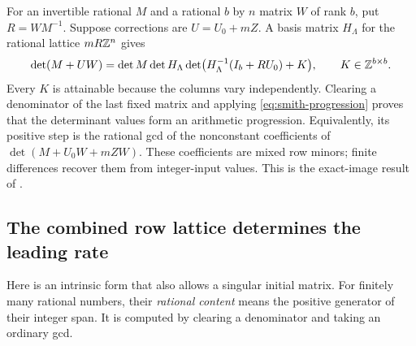 For an invertible rational $M$ and a rational $b$ by $n$ matrix $W$
of rank $b$, put $R=WM^{-1}$. Suppose corrections are
$U=U_0+mZ$. A basis matrix $H_\Lambda$ for the rational lattice
$mR\mathbb Z^n$ gives
\[
 \det(M+UW)=\det M\det H_\Lambda
       \det\bigl(H_\Lambda^{-1}(I_b+RU_0)+K\bigr),
 \qquad K\in\mathbb Z^{b\times b}.
\]
Every $K$ is attainable because the columns vary independently.
Clearing a denominator of the last fixed matrix and applying
\eqref{eq:smith-progression} proves that the determinant values form
an arithmetic progression. Equivalently, its positive step is the
rational gcd of the nonconstant coefficients of
$\det(M+U_0W+mZW)$. These coefficients are mixed row minors; finite
differences recover them from integer-input values. This is the
exact-image result of .

\subsection{The combined row lattice determines the leading rate}

Here is an intrinsic form that also allows a singular initial matrix.
For finitely many rational numbers, their \emph{rational content}
means the positive generator of their integer span. It is computed by
clearing a denominator and taking an ordinary gcd.

